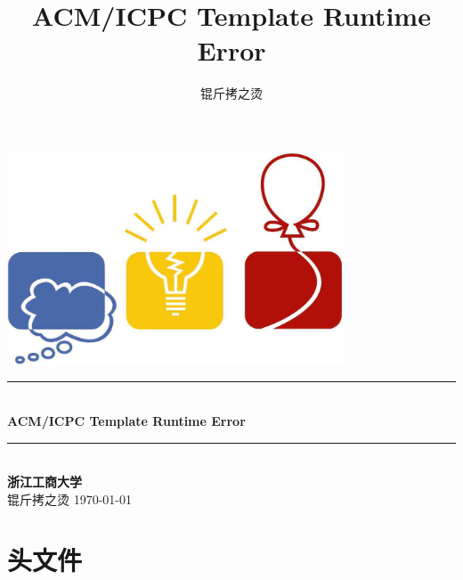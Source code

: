 \documentclass[twoside]{article}
\title{ACM/ICPC Template Runtime Error}
\author{锟斤拷之烫}
\newcommand{\HRule}{\rule{\linewidth}{0.5mm}}
\begin{document}
\small
\begin{titlepage}
\begin{center}
\vspace*{0.5cm}\includegraphics[width=0.75\textwidth]{logo.jpg} \\ [2cm]
\HRule \\ [1cm]
\textbf{\Huge{ACM/ICPC Template Runtime Error}} \\ [0.5cm]
\HRule \\ [4cm]
\textbf{\Huge{浙江工商大学}} \\ [1cm]
\LARGE{锟斤拷之烫}
\vfill
\Large{\today}
\end{center}
\clearpage
\end{titlepage}
\tableofcontents\clearpage
\pagestyle{fancy}
\lfoot{}
\cfoot{\thepage}\rfoot{}
\setcounter{section}{-1}
\setcounter{page}{1}
\clearpage\section{头文件}
\end{document}
